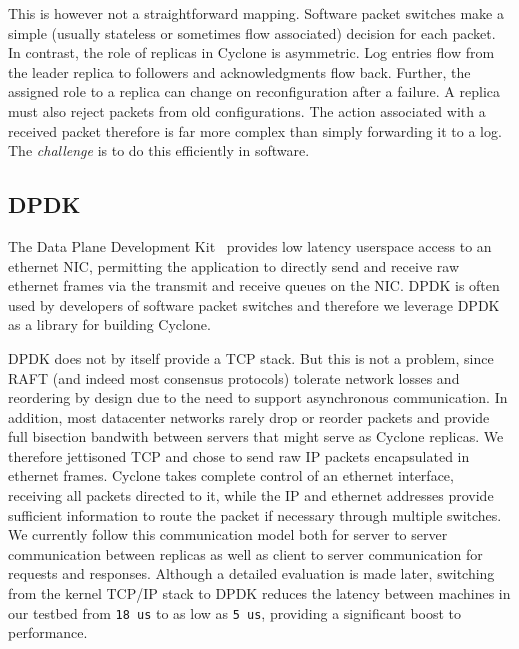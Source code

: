 \documentclass[pageno]{jpaper}
\begin{document}
This is however not a straightforward mapping. Software packet switches make a
simple (usually stateless or sometimes flow associated) decision for each
packet. In contrast, the role of replicas in Cyclone is asymmetric. Log entries
flow from the leader replica to followers and acknowledgments flow
back. Further, the assigned role to a replica can change on reconfiguration
after a failure. A replica must also reject packets from old configurations. The
action associated with a received packet therefore is far more complex than
simply forwarding it to a log.  The \emph{challenge} is to do this efficiently
in software.

\subsection{DPDK}
The Data Plane Development Kit~\cite{dpdk} provides low latency userspace access
to an ethernet NIC, permitting the application to directly send and receive raw
ethernet frames via the transmit and receive queues on the NIC. DPDK is often
used by developers of software packet switches and therefore we leverage
DPDK as a library for building Cyclone.

DPDK does not by itself provide a TCP stack. But this is not a problem, since
RAFT (and indeed most consensus protocols) tolerate network losses and
reordering by design due to the need to support asynchronous communication. In
addition, most datacenter networks rarely drop or reorder packets and provide
full bisection bandwith between servers that might serve as Cyclone replicas. We
therefore jettisoned TCP and chose to send raw IP packets encapsulated in
ethernet frames. Cyclone takes complete control of an ethernet interface,
receiving all packets directed to it, while the IP and ethernet addresses
provide sufficient information to route the packet if necessary through multiple
switches. We currently follow this communication model both for server to server
communication between replicas as well as client to server communication for
requests and responses. Although a detailed evaluation is made later, switching
from the kernel TCP/IP stack to DPDK reduces the latency between machines in our
testbed from {\tt 18 us} to as low as {\tt 5 us}, providing a significant boost
to performance.
\end{document}
